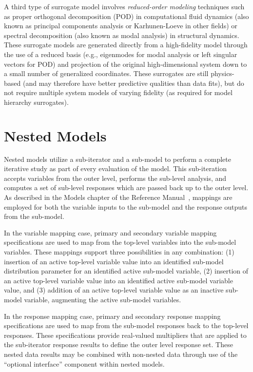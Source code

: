 A third type of surrogate model involves {\em reduced-order modeling}
techniques such as proper orthogonal decomposition (POD) in
computational fluid dynamics (also known as principal components
analysis or Karhunen-Loeve in other fields) or spectral decomposition
(also known as modal analysis) in structural dynamics.  These
surrogate models are generated directly from a high-fidelity model
through the use of a reduced basis (e.g., eigenmodes for modal
analysis or left singular vectors for POD) and projection of the
original high-dimensional system down to a small number of generalized
coordinates.  These surrogates are still physics-based (and may
therefore have better predictive qualities than data fits), but do not
require multiple system models of varying fidelity (as required for
model hierarchy surrogates).

\section{Nested Models} \label{models:nested}

Nested models utilize a sub-iterator and a sub-model to perform a
complete iterative study as part of every evaluation of the model.
This sub-iteration accepts variables from the outer level, performs
the sub-level analysis, and computes a set of sub-level responses
which are passed back up to the outer level.  As described in the
Models chapter of the Reference Manual~\cite{RefMan}, mappings are
employed for both the variable inputs to the sub-model and the
response outputs from the sub-model.

In the variable mapping case, primary and secondary variable
mapping specifications are used to map from the top-level variables
into the sub-model variables.  These mappings support three
possibilities in any combination: (1) insertion of an active top-level
variable value into an identified sub-model distribution parameter for
an identified active sub-model variable, (2) insertion of an active
top-level variable value into an identified active sub-model variable
value, and (3) addition of an active top-level variable value as an
inactive sub-model variable, augmenting the active sub-model
variables.

In the response mapping case, primary and secondary response
mapping specifications are used to map from the sub-model responses
back to the top-level responses.  These specifications provide
real-valued multipliers that are applied to the sub-iterator response
results to define the outer level response set.  These nested data
results may be combined with non-nested data through use of the 
``optional interface'' component within nested models.

